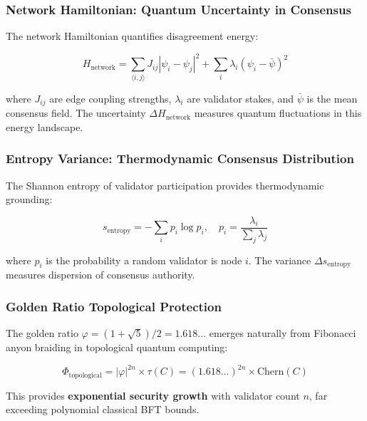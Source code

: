 \documentclass[11pt,a4paper]{article}
\begin{document}
\subsubsection{Network Hamiltonian: Quantum Uncertainty in Consensus}

The network Hamiltonian quantifies disagreement energy:

\begin{equation}
H_{\text{network}} = \sum_{\langle i,j \rangle} J_{ij}|\psi_i - \psi_j|^2 + \sum_i \lambda_i(\psi_i - \bar{\psi})^2
\label{eq:network-hamiltonian}
\end{equation}

where $J_{ij}$ are edge coupling strengths, $\lambda_i$ are validator stakes, and $\bar{\psi}$ is the mean consensus field. The uncertainty $\Delta H_{\text{network}}$ measures quantum fluctuations in this energy landscape.

\subsubsection{Entropy Variance: Thermodynamic Consensus Distribution}

The Shannon entropy of validator participation provides thermodynamic grounding:

\begin{equation}
s_{\text{entropy}} = -\sum_i p_i \log p_i, \quad p_i = \frac{\lambda_i}{\sum_j \lambda_j}
\end{equation}

where $p_i$ is the probability a random validator is node $i$. The variance $\Delta s_{\text{entropy}}$ measures dispersion of consensus authority.

\subsubsection{Golden Ratio Topological Protection}

The golden ratio $\varphi = (1 + \sqrt{5})/2 = 1.618\ldots$ emerges naturally from Fibonacci anyon braiding in topological quantum computing:

\begin{equation}
\Phi_{\text{topological}} = |\varphi|^{2n} \times \tau(C) = (1.618\ldots)^{2n} \times \text{Chern}(C)
\end{equation}

This provides \textbf{exponential security growth} with validator count $n$, far exceeding polynomial classical BFT bounds.
\end{document}
